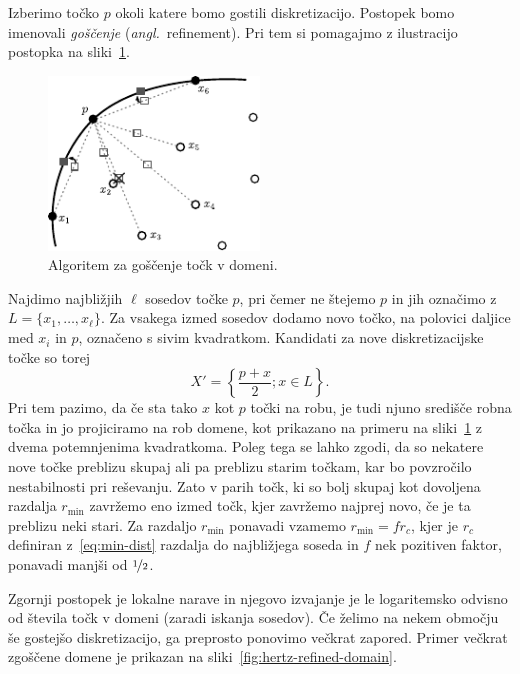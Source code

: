 \documentclass[12pt,a4paper,twoside]{article}
\theoremstyle{definition} %
\theoremstyle{plain} %
\numberwithin{equation}{section}
\newcommand{\ang}[1]{(\textit{angl.}\ #1)}
\begin{document}
Izberimo točko $p$ okoli katere bomo gostili diskretizacijo. Postopek bomo imenovali \emph{goščenje}
\ang{refinement}. Pri tem si pomagajmo z ilustracijo postopka na sliki~\ref{fig:refine-algorithm}.
\begin{figure}[h]
  \centering
  \includegraphics[width=0.5\textwidth]{images/domain_refine.pdf}
  \caption{Algoritem za goščenje točk v domeni.}
  \label{fig:refine-algorithm}
\end{figure}
Najdimo najbližjih $\ell$ sosedov točke $p$, pri čemer ne štejemo $p$ in jih
označimo z $L = \{x_1, \dots, x_\ell\}$.
Za vsakega izmed sosedov dodamo novo točko, na polovici daljice med $x_i$ in $p$, označeno s sivim
kvadratkom. Kandidati za nove diskretizacijske točke so torej
\[
  X' = \left\{ \frac{p+x}{2}; x \in L \right\}.
\]
Pri tem pazimo, da če sta tako $x$ kot $p$ točki na robu, je tudi njuno središče robna točka in jo
projiciramo na rob domene, kot prikazano na primeru na sliki~\ref{fig:refine-algorithm} z dvema
potemnjenima kvadratkoma. Poleg tega se lahko zgodi, da so nekatere nove točke preblizu skupaj ali
pa preblizu starim točkam, kar bo povzročilo nestabilnosti pri reševanju. Zato v parih točk, ki so
bolj skupaj kot dovoljena razdalja $r_{\text{min}}$ zavržemo eno izmed točk, kjer zavržemo najprej
novo, če je ta preblizu neki stari. Za razdaljo $r_\text{min}$ ponavadi vzamemo $r_\text{min} =
f r_c$, kjer je $r_c$ definiran z~\eqref{eq:min-dist} razdalja do najbližjega soseda in $f$ nek
pozitiven faktor, ponavadi manjši od $\nicefrac{1}{2}$.

Zgornji postopek je lokalne narave in njegovo izvajanje je le logaritemsko odvisno od števila
točk v domeni (zaradi iskanja sosedov). Če želimo na nekem območju še gostejšo diskretizacijo,
ga preprosto ponovimo večkrat zapored. Primer večkrat zgoščene domene je prikazan na
sliki~\ref{fig:hertz-refined-domain}.
\end{document}
